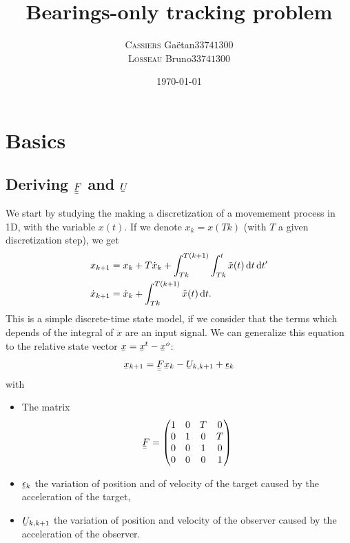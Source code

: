 \documentclass[english,DIV=13]{scrreprt}
\title{Bearings-only tracking problem}
\subtitle{}
\author{\begin{tabular}{cc}
	\textsc{Cassiers} Gaëtan  & 	$33741300$ \\
	\textsc{Losseau} Bruno 	&	$33741300$
	 \end{tabular}}
\date{\today}
\newcommand{\ubar}[1]{\underaccent{\bar}{#1}}
\newcommand{\uvec}[1]{\ubar{#1}}
\newcommand{\umatrix}[1]{\ubar{\ubar{#1}}}
\begin{document}
\maketitle


\tableofcontents


\chapter{Basics}
\section*{Deriving $\umatrix{F}$ and $\uvec{U}$}

We start by studying the making a discretization of a movemement process in 1D, with the
variable $x(t)$. If we denote $x_k = x(Tk)$ (with $T$ a given discretization step), we
get
\begin{align*}
    x_{k+1} &= x_k + T\dot{x}_k + \int_{Tk}^{T(k+1)}\int_{Tk}^{t}\ddot{x}(t)\operatorname{d}\! t\operatorname{d}\! t' \\
    \dot{x}_{k+1} &=  \dot{x}_k + \int_{Tk}^{T(k+1)}\ddot{x}(t)\operatorname{d}\! t.
\end{align*}
This is a simple discrete-time state model, if we consider that the terms which depends of
the integral of $\ddot{x}$
are an input signal.
We can generalize this equation to the relative state vector $\uvec{x} = \uvec{x}^t - \uvec{x}^o$:
\[\uvec{x}_{k+1} = \umatrix{F}\uvec{x}_k - \uvec{U}_{k,k+1} + \uvec{\epsilon}_k\]
with
\begin{itemize}
    \item The matrix
        \[\umatrix{F} =
        \begin{pmatrix}
            1 & 0 & T & 0 \\
            0 & 1 & 0 & T \\   
            0 & 0 & 1 & 0 \\
            0 & 0 & 0 & 1   
        \end{pmatrix}
        \]
    \item $\uvec{\epsilon}_k$ the variation of position and of velocity of the target caused by the
acceleration of the target,
    \item $\uvec{U}_{k,k+1}$ the variation of position and velocity of
the observer caused by the acceleration of the observer.
\end{itemize}
\end{document}
